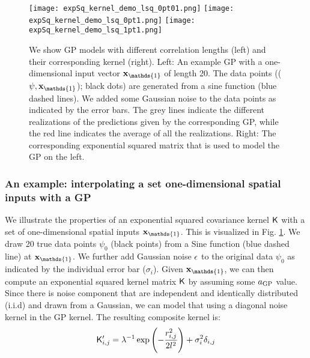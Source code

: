 \begin{figure}
	\centering
	\texttt{[image: expSq\_kernel\_demo\_lsq\_0pt01.png]}
	\texttt{[image: expSq\_kernel\_demo\_lsq\_0pt1.png]}
	\texttt{[image: expSq\_kernel\_demo\_lsq\_1pt1.png]}
	\caption{
		We show GP models with different correlation lengths (left) and their
		corresponding kernel (right).
		Left: An example GP with a one-dimensional input vector $\xv_\mathds{1}$
		of length 20. The data points (($\psi, \xv_\mathds{1}$); black dots) 
		are generated from a sine function (blue dashed lines).  
		We added some Gaussian noise to the data points as indicated by the error bars. 
		The grey lines indicate the different realizations of
		the predictions given by the corresponding GP, while the red line indicates the
		average of all the realizations.  
		Right: The corresponding exponential squared matrix that is used to model
		the GP on the left. 
		\label{fig:one_d_gaussian_process}}
\end{figure}


\subsubsection{An example: interpolating a set one-dimensional spatial inputs
with a GP}
\label{subsubsec:interpolation}
We illustrate the properties of an exponential squared covariance kernel
$\mathsf{K}$ with a set of one-dimensional spatial inputs $\xv_{\mathds{1}}$. 
This is visualized in Fig. \ref{fig:one_d_gaussian_process}.
We draw 20 true data points $\psi_0$ (black points) from a Sine function (blue dashed line) at
$\xv_\mathds{1}$.
We further add Gaussian noise ${\bf\epsilon}$ to the original data $\psi_0$ as
indicated by the individual error bar ($\sigma_i$). 
Given $\xv_\mathds{1}$, we can then compute an exponential squared kernel matrix $\mathsf{K}$ 
by assuming some $a_{\rm GP}$ value. Since there is noise
component that are independent and identically distributed (i.i.d) and drawn
from a Gaussian, we can model that using a diagonal noise kernel in the GP kernel. 
The resulting composite kernel is:
\begin{equation}
	\mathsf{K}'_{i, j} = \lambda^{-1} \exp \left(-\frac{r_{i,j}^2}{2 l^2}\right) + \sigma_i^2
	\delta_{i, j}
\end{equation}

